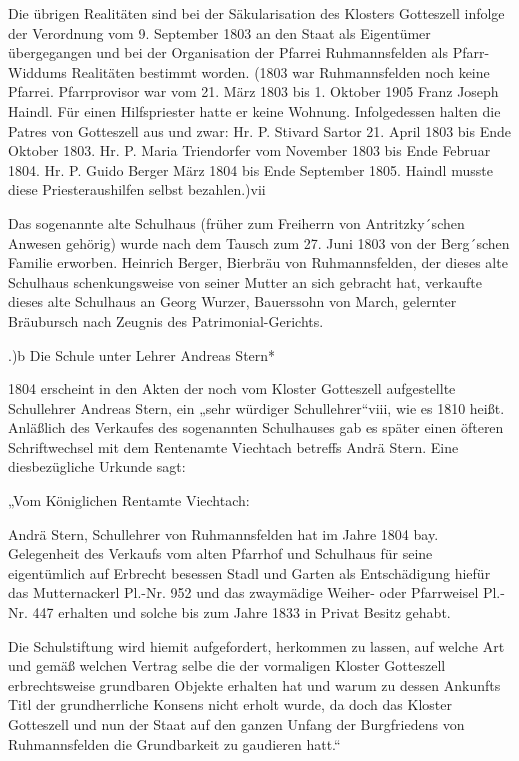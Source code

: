 \documentclass[12pt,a4paper]{book}
\begin{document}
Die übrigen Realitäten sind bei der Säkularisation des Klosters Gotteszell
infolge der Verordnung vom 9. September 1803 an den Staat als Eigentümer
übergegangen und bei der Organisation der Pfarrei Ruhmannsfelden als
Pfarr-Widdums Realitäten bestimmt worden. (1803 war Ruhmannsfelden noch keine
Pfarrei. Pfarrprovisor war vom 21. März 1803 bis 1. Oktober 1905 Franz Joseph
Haindl. Für einen Hilfspriester hatte er keine Wohnung. Infolgedessen halten die
Patres von Gotteszell aus und zwar: Hr. P. Stivard Sartor 21. April 1803 bis
Ende Oktober 1803. Hr. P. Maria Triendorfer vom November 1803 bis Ende Februar
1804. Hr. P. Guido Berger März 1804 bis Ende September 1805. Haindl musste diese
Priesteraushilfen selbst bezahlen.)vii

Das sogenannte alte Schulhaus (früher zum Freiherrn von Antritzky´schen Anwesen
gehörig) wurde nach dem Tausch zum 27. Juni 1803 von der Berg´schen Familie
erworben. Heinrich Berger, Bierbräu von Ruhmannsfelden, der dieses alte
Schulhaus schenkungsweise von seiner Mutter an sich gebracht hat, verkaufte
dieses alte Schulhaus an Georg Wurzer, Bauerssohn von March, gelernter
Bräubursch nach Zeugnis des Patrimonial-Gerichts.

.)b Die Schule unter Lehrer Andreas Stern*

1804 erscheint in den Akten der noch vom Kloster Gotteszell aufgestellte
Schullehrer Andreas Stern, ein „sehr würdiger Schullehrer“viii, wie es 1810
heißt. Anläßlich des Verkaufes des sogenannten Schulhauses gab es später einen
öfteren Schriftwechsel mit dem Rentenamte Viechtach betreffs Andrä Stern. Eine
diesbezügliche Urkunde sagt:

„Vom Königlichen Rentamte Viechtach:

Andrä Stern, Schullehrer von Ruhmannsfelden hat im Jahre 1804 bay. Gelegenheit
des Verkaufs vom alten Pfarrhof und Schulhaus für seine eigentümlich auf
Erbrecht besessen Stadl und Garten als Entschädigung hiefür das Mutternackerl
Pl.-Nr. 952 und das zwaymädige Weiher- oder Pfarrweisel Pl.-Nr. 447 erhalten und
solche bis zum Jahre 1833 in Privat Besitz gehabt.

Die Schulstiftung wird hiemit aufgefordert, herkommen zu lassen, auf welche Art
und gemäß welchen Vertrag selbe die der vormaligen Kloster Gotteszell
erbrechtsweise grundbaren Objekte erhalten hat und warum zu dessen Ankunfts Titl
der grundherrliche Konsens nicht erholt wurde, da doch das Kloster Gotteszell
und nun der Staat auf den ganzen Unfang der Burgfriedens von Ruhmannsfelden die
Grundbarkeit zu gaudieren hatt.“
\end{document}
